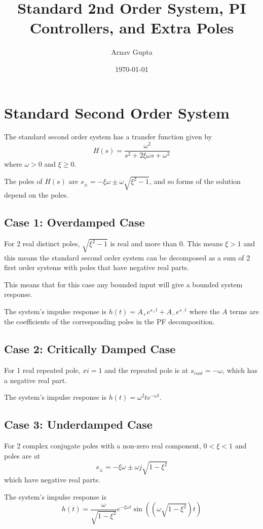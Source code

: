 \documentclass[11pt]{article}
\author{Arnav Gupta}
\date{\today}
\title{Standard 2nd Order System, PI Controllers, and Extra Poles}
\begin{document}
\maketitle
\tableofcontents

\section{Standard Second Order System}
\label{sec:org62c989b}
The standard second order system has a transfer function given by
$$
H(s) = \frac{\omega^{2}}{s^{2} + 2\xi \omega s + \omega^{2}}
$$
where \(\omega > 0\) and \(\xi \ge 0\).

The poles of \(H(s)\) are \(s_{\pm} = -\xi \omega \pm \omega \sqrt{\xi^{2} - 1}\),
and so forms of the solution depend on the poles.
\subsection{Case 1: Overdamped Case}
\label{sec:org93bd4bd}
For 2 real distinct poles, \(\sqrt{\xi^{2} - 1}\) is real and more than 0.
This means \(\xi > 1\) and this means the standard second order system can be
decomposed as a sum of 2 first order systems with poles that have
negative real parts.

This means that for this case any bounded input will give a bounded system
response.

The system's impulse response is \(h(t) = A_{+} e^{s_{ +}t} + A_{-} e^{s_{ -}t}\)
where the \(A\) terms are the coefficients of the corresponding poles in the
PF decomposition.
\subsection{Case 2: Critically Damped Case}
\label{sec:orgdc9fc0f}
For 1 real repeated pole, \(xi = 1\) and the repeated pole is at \(s_{root} = - \omega\),
which has a negative real part.

The system's impulse response is \(h(t) = \omega^{2} t e^{-\omega t}\).
\subsection{Case 3: Underdamped Case}
\label{sec:orgcbf7da7}
For 2 complex conjugate poles with a non-zero real component, \(0 < \xi < 1\) and
poles are at
$$
s_{\pm} = -\xi \omega \pm \omega j \sqrt{1 - \xi^{2}}
$$
which have negative real parts.

The system's impulse response is
$$
h(t) = \frac{\omega}{\sqrt{1 - \xi^{2}}} e^{-\xi \omega t}
\sin((\omega \sqrt{1 - \xi^{2}})t)
$$
\end{document}
